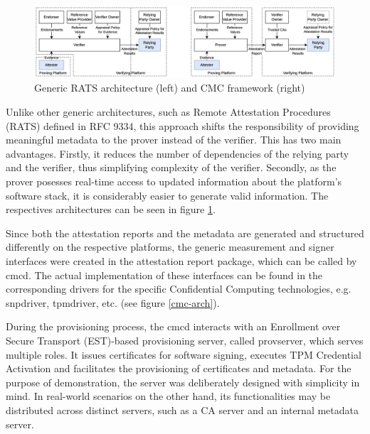 \begin{figure}
	\begin{center} 
		\includegraphics[width=1.0\linewidth]{figures/rats-vs-cmc.png}
	\end{center}
	\caption{Generic RATS architecture (left) and CMC framework (right) \cite{CMC_paper}} 
	\label{rats-cmc}
\end{figure}

Unlike other generic architectures, such as Remote Attestation Procedures (RATS) defined in RFC 9334, this approach shifts the responsibility of providing meaningful metadata to the prover instead of the verifier. 
This has two main advantages. Firstly, it reduces the number of dependencies of the relying party and the verifier, thus simplifying complexity of the verifier. Secondly, as the prover posesses real-time access to updated information about the platform's software stack, it is considerably easier to generate valid information. The respectives architectures can be seen in figure \ref{rats-cmc}.

Since both the attestation reports and the metadata are generated and structured differently on the respective platforms, the generic measurement and signer interfaces were created in the attestation report package, which can be called by cmcd. The actual implementation of these interfaces can be found in the corresponding drivers for the specific Confidential Computing technologies, e.g. snpdriver, tpmdriver, etc. (see figure \ref{cmc-arch}).

During the provisioning process, the cmcd interacts with an Enrollment over Secure Transport (EST)-based provisioning server, called provserver, which serves multiple roles. It issues certificates for software signing, executes TPM Credential Activation and facilitates the provisioning of certificates and metadata. For the purpose of demonstration, the server was deliberately designed with simplicity in mind. In real-world scenarios on the other hand, its functionalities may be distributed across distinct servers, such as a CA server and an internal metadata server. \cite{Github_CMC}

